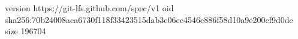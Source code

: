 version https://git-lfs.github.com/spec/v1
oid sha256:70b24008aca6730f118f33423515dab3e06cc4546e886f58d10a9e200cf9d0de
size 196704

